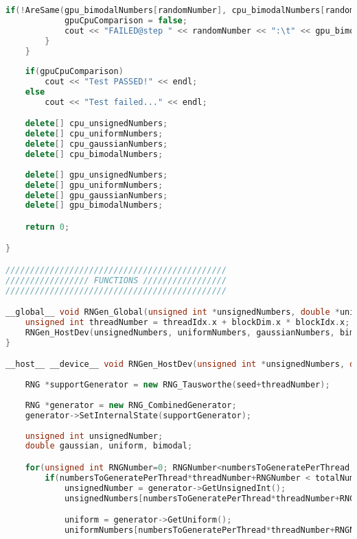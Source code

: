 \begin{lstlisting}[language=C++, caption={\texttt{libraries/CoreLibraries/RandomGenerator/OutputTest.cu}}]
		if(!AreSame(gpu_bimodalNumbers[randomNumber], cpu_bimodalNumbers[randomNumber])){
			gpuCpuComparison = false;
			cout << "FAILED@step " << randomNumber << ":\t" << gpu_bimodalNumbers[randomNumber] << "\t" << cpu_bimodalNumbers[randomNumber] << endl;
		}
	}
	
	if(gpuCpuComparison)
		cout << "Test PASSED!" << endl;
	else
		cout << "Test failed..." << endl;

	delete[] cpu_unsignedNumbers;
	delete[] cpu_uniformNumbers;
	delete[] cpu_gaussianNumbers;
	delete[] cpu_bimodalNumbers;
	
	delete[] gpu_unsignedNumbers;
	delete[] gpu_uniformNumbers;
	delete[] gpu_gaussianNumbers;
	delete[] gpu_bimodalNumbers;

	return 0;

}

/////////////////////////////////////////////
///////////////// FUNCTIONS /////////////////
/////////////////////////////////////////////

__global__ void RNGen_Global(unsigned int *unsignedNumbers, double *uniformNumbers, double *gaussianNumbers, double *bimodalNumbers, unsigned int totalNumbersToGenerate, unsigned int numbersToGeneratePerThread, unsigned int seed){
	unsigned int threadNumber = threadIdx.x + blockDim.x * blockIdx.x;
	RNGen_HostDev(unsignedNumbers, uniformNumbers, gaussianNumbers, bimodalNumbers, totalNumbersToGenerate, numbersToGeneratePerThread, seed, threadNumber);
}

__host__ __device__ void RNGen_HostDev(unsigned int *unsignedNumbers, double *uniformNumbers, double *gaussianNumbers, double *bimodalNumbers, unsigned int totalNumbersToGenerate, unsigned int numbersToGeneratePerThread, unsigned int seed, unsigned int threadNumber){
	
	RNG *supportGenerator = new RNG_Tausworthe(seed+threadNumber);
	
	RNG *generator = new RNG_CombinedGenerator;
	generator->SetInternalState(supportGenerator);
	
	unsigned int unsignedNumber;
	double gaussian, uniform, bimodal;

	for(unsigned int RNGNumber=0; RNGNumber<numbersToGeneratePerThread; ++RNGNumber){		
		if(numbersToGeneratePerThread*threadNumber+RNGNumber < totalNumbersToGenerate){
			unsignedNumber = generator->GetUnsignedInt();
			unsignedNumbers[numbersToGeneratePerThread*threadNumber+RNGNumber] = unsignedNumber;

			uniform = generator->GetUniform();
			uniformNumbers[numbersToGeneratePerThread*threadNumber+RNGNumber] = uniform;
		

\end{lstlisting}
